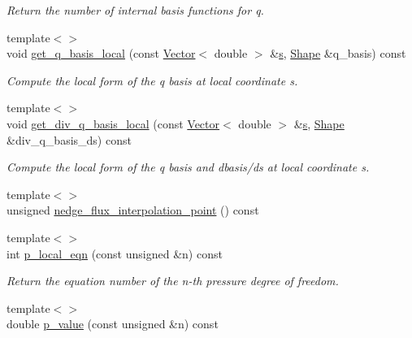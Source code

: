 \begin{DoxyCompactItemize}
\begin{DoxyCompactList}\small\item\em Return the number of internal basis functions for q. \end{DoxyCompactList}\item 
{\footnotesize template$<$$>$ }\\void \hyperlink{classoomph_1_1TRaviartThomasDarcyElement_a06df8d098318e1ef45259e2f65ed35be}{get\+\_\+q\+\_\+basis\+\_\+local} (const \hyperlink{classoomph_1_1Vector}{Vector}$<$ double $>$ \&\hyperlink{cfortran_8h_ab7123126e4885ef647dd9c6e3807a21c}{s}, \hyperlink{classoomph_1_1Shape}{Shape} \&q\+\_\+basis) const
\begin{DoxyCompactList}\small\item\em Compute the local form of the q basis at local coordinate s. \end{DoxyCompactList}\item 
{\footnotesize template$<$$>$ }\\void \hyperlink{classoomph_1_1TRaviartThomasDarcyElement_a054174561fc65ac0406c6e18fb2d0daa}{get\+\_\+div\+\_\+q\+\_\+basis\+\_\+local} (const \hyperlink{classoomph_1_1Vector}{Vector}$<$ double $>$ \&\hyperlink{cfortran_8h_ab7123126e4885ef647dd9c6e3807a21c}{s}, \hyperlink{classoomph_1_1Shape}{Shape} \&div\+\_\+q\+\_\+basis\+\_\+ds) const
\begin{DoxyCompactList}\small\item\em Compute the local form of the q basis and dbasis/ds at local coordinate s. \end{DoxyCompactList}\item 
{\footnotesize template$<$$>$ }\\unsigned \hyperlink{classoomph_1_1TRaviartThomasDarcyElement_a0dfc4273d662f5e70284c4cedb2f9b7b}{nedge\+\_\+flux\+\_\+interpolation\+\_\+point} () const
\item 
{\footnotesize template$<$$>$ }\\int \hyperlink{classoomph_1_1TRaviartThomasDarcyElement_a61ab9a21f152902ddd1869cd2c358602}{p\+\_\+local\+\_\+eqn} (const unsigned \&n) const
\begin{DoxyCompactList}\small\item\em Return the equation number of the n-\/th pressure degree of freedom. \end{DoxyCompactList}\item 
{\footnotesize template$<$$>$ }\\double \hyperlink{classoomph_1_1TRaviartThomasDarcyElement_ab99e0a8bb2f6ba44dc4e54e0c2fda887}{p\+\_\+value} (const unsigned \&n) const

\end{DoxyCompactItemize}
